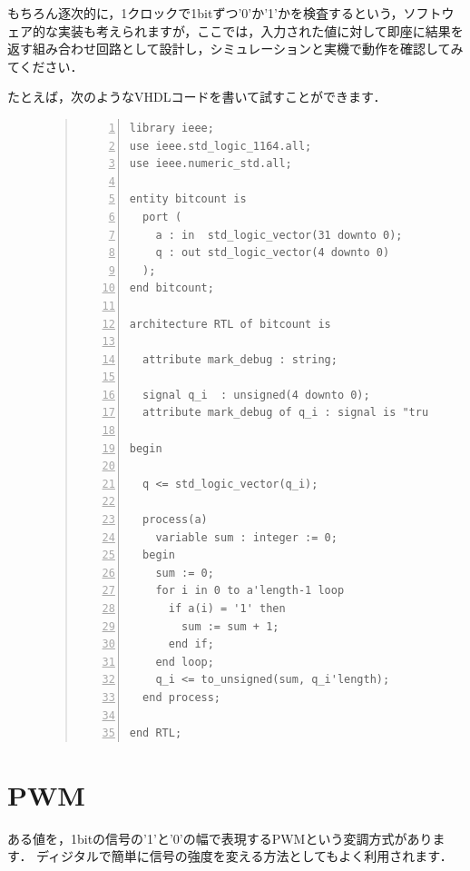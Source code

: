 \documentclass[a4paper,dvipdfmx]{jsarticle}
\begin{document}
もちろん逐次的に，1クロックで1bitずつ'0'か'1'かを検査するという，ソフトウェア的な実装も考えられますが，ここでは，入力された値に対して即座に結果を返す組み合わせ回路として設計し，シミュレーションと実機で動作を確認してみてください．

たとえば，次のようなVHDLコードを書いて試すことができます．
\begin{figure}[H]
\begin{quote}
\begin{Verbatim}[frame=single, numbers=left, baselinestretch=0.8]
library ieee;
use ieee.std_logic_1164.all;
use ieee.numeric_std.all;

entity bitcount is
  port (
    a : in  std_logic_vector(31 downto 0);
    q : out std_logic_vector(4 downto 0)
  );
end bitcount;

architecture RTL of bitcount is
  
  attribute mark_debug : string;

  signal q_i  : unsigned(4 downto 0);
  attribute mark_debug of q_i : signal is "true";

begin

  q <= std_logic_vector(q_i);

  process(a)
    variable sum : integer := 0;
  begin
    sum := 0;
    for i in 0 to a'length-1 loop
      if a(i) = '1' then
        sum := sum + 1;
      end if;
    end loop;
    q_i <= to_unsigned(sum, q_i'length);
  end process;
  
end RTL;
\end{Verbatim}
\end{quote}
\end{figure}


\section{PWM}

ある値を，1bitの信号の'1'と'0'の幅で表現するPWMという変調方式があります．
ディジタルで簡単に信号の強度を変える方法としてもよく利用されます．
\end{document}
